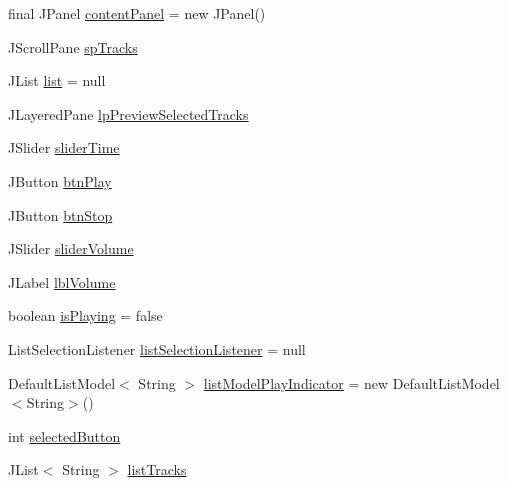 \begin{DoxyCompactItemize}
\item 
final J\+Panel \hyperlink{classcom_1_1lclion_1_1midigui_1_1_dialog_track_import_ac383c7b38c74b9e1cc245a00de4fbb5e}{content\+Panel} = new J\+Panel()
\item 
J\+Scroll\+Pane \hyperlink{classcom_1_1lclion_1_1midigui_1_1_dialog_track_import_a844df9120f38157448c7658bc2d8a1a7}{sp\+Tracks}
\item 
J\+List \hyperlink{classcom_1_1lclion_1_1midigui_1_1_dialog_track_import_aa1bcfa7d07c255e455ca5515e0369310}{list} = null
\item 
J\+Layered\+Pane \hyperlink{classcom_1_1lclion_1_1midigui_1_1_dialog_track_import_a04703476bb0bc1cd0fdbe05cf3d46858}{lp\+Preview\+Selected\+Tracks}
\item 
J\+Slider \hyperlink{classcom_1_1lclion_1_1midigui_1_1_dialog_track_import_a8f1c2180a937d6483a4912d602dfe023}{slider\+Time}
\item 
J\+Button \hyperlink{classcom_1_1lclion_1_1midigui_1_1_dialog_track_import_aa1718d1d474c9cc2c8f72edef9c6d767}{btn\+Play}
\item 
J\+Button \hyperlink{classcom_1_1lclion_1_1midigui_1_1_dialog_track_import_a3e498460ccccf41b258ee18a8ea8d988}{btn\+Stop}
\item 
J\+Slider \hyperlink{classcom_1_1lclion_1_1midigui_1_1_dialog_track_import_a71f41e4a3f136fb318fb088bd4695dc2}{slider\+Volume}
\item 
J\+Label \hyperlink{classcom_1_1lclion_1_1midigui_1_1_dialog_track_import_a8501b39c874b5ed02e4c630f78aa5de5}{lbl\+Volume}
\item 
boolean \hyperlink{classcom_1_1lclion_1_1midigui_1_1_dialog_track_import_aec5da3d6a3d10d8707c05f13ff00e7ac}{is\+Playing} = false
\item 
List\+Selection\+Listener \hyperlink{classcom_1_1lclion_1_1midigui_1_1_dialog_track_import_afc740efab3ca321614150cdc795f841d}{list\+Selection\+Listener} = null
\item 
Default\+List\+Model$<$ String $>$ \hyperlink{classcom_1_1lclion_1_1midigui_1_1_dialog_track_import_a633a346cf94f727ba816e3f85788d1f1}{list\+Model\+Play\+Indicator} = new Default\+List\+Model$<$String$>$()
\item 
int \hyperlink{classcom_1_1lclion_1_1midigui_1_1_dialog_track_import_acddc2ec0ef9a995af7cb614afbdd3f46}{selected\+Button}
\item 
J\+List$<$ String $>$ \hyperlink{classcom_1_1lclion_1_1midigui_1_1_dialog_track_import_a37595f2a0234ab4d9a8b01e23e4997be}{list\+Tracks}

\end{DoxyCompactItemize}
